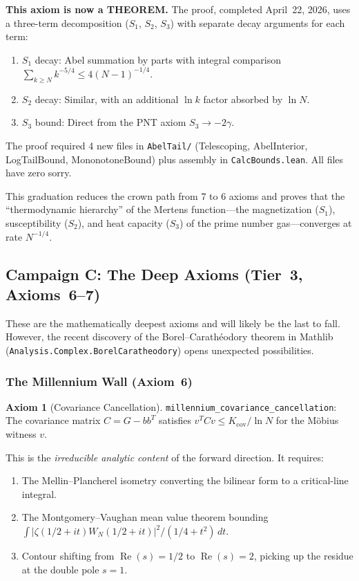 \documentclass[11pt,a4paper]{article}
\theoremstyle{definition}
\newtheorem{axiombox}[definition]{Axiom}
\newcommand{\re}{\operatorname{Re}}
\newcommand{\lean}[1]{\texttt{#1}}
\begin{document}
\textbf{This axiom is now a THEOREM.} The proof, completed April~22, 2026,
uses a three-term decomposition ($S_1$, $S_2$, $S_3$) with separate
decay arguments for each term:
\begin{enumerate}
  \item $S_1$ decay: Abel summation by parts with integral comparison
    $\sum_{k \geq N} k^{-5/4} \le 4(N-1)^{-1/4}$.
  \item $S_2$ decay: Similar, with an additional $\ln k$ factor absorbed
    by $\ln N$.
  \item $S_3$ bound: Direct from the PNT axiom $S_3 \to -2\gamma$.
\end{enumerate}
The proof required 4 new files in \lean{AbelTail/} (Telescoping, AbelInterior,
LogTailBound, MononotoneBound) plus assembly in \lean{CalcBounds.lean}.
All files have zero sorry.

This graduation reduces the crown path from 7 to 6 axioms and proves
that the ``thermodynamic hierarchy'' of the Mertens function---the
magnetization ($S_1$), susceptibility ($S_2$), and heat capacity ($S_3$)
of the prime number gas---converges at rate $N^{-1/4}$.

\subsection{Campaign C: The Deep Axioms (Tier~3, Axioms~6--7)}

These are the mathematically deepest axioms and will likely be the last
to fall. However, the recent discovery of the Borel--Carath\'eodory
theorem in Mathlib (\texttt{Analysis.Complex.BorelCaratheodory}) opens
unexpected possibilities.

\subsubsection{The Millennium Wall (Axiom~6)}

\begin{axiombox}[Covariance Cancellation]
\lean{millennium\_covariance\_cancellation}: The covariance matrix
$C = G - bb^T$ satisfies $v^T C v \le K_{\mathrm{cov}}/\ln N$ for the
M\"obius witness $v$.
\end{axiombox}

This is the \emph{irreducible analytic content} of the forward direction.
It requires:
\begin{enumerate}
  \item The Mellin--Plancherel isometry converting the bilinear form
    to a critical-line integral.
  \item The Montgomery--Vaughan mean value theorem bounding
    $\int |\zeta(1/2+it) W_N(1/2+it)|^2 / (1/4+t^2)\,dt$.
  \item Contour shifting from $\re(s) = 1/2$ to $\re(s) = 2$,
    picking up the residue at the double pole $s = 1$.
\end{enumerate}
\end{document}
